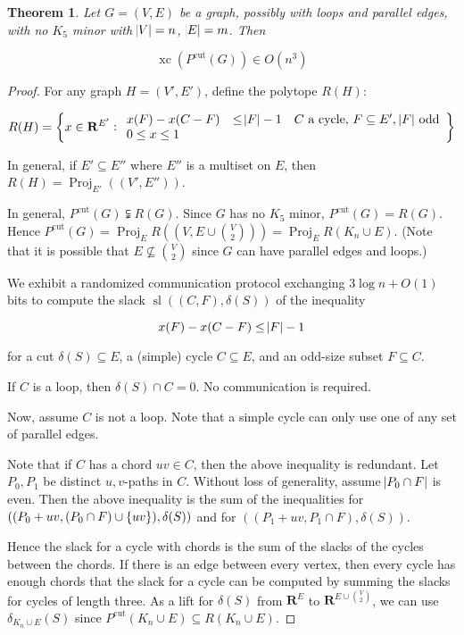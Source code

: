 \documentclass{article}
\newtheorem{theorem}{Theorem}
\DeclareMathOperator{\xc}{xc}
\DeclareMathOperator{\proj}{Proj}
\DeclareMathOperator{\Sl}{sl}
\begin{document}
\begin{theorem}
	Let $G=(V,E)$ be a graph, possibly with loops and parallel edges, with no $K_5$ minor with $\abs{V}=n$, $\abs{E}=m$. Then 

$$\xc(P^{\text{cut}}(G)) \in O(n^3)$$
\end{theorem}
\begin{proof}
For any graph $H=(V', E')$, define the polytope $R(H)$:

$$R(H) = \cbr{x\in \mathbf{R}^{E'}: \begin{array}{lll} x(F) - x(C-F) & \leq \abs{F} - 1 & \text{$C$ a cycle, $F\subseteq E'$, $\abs{F}$ odd} \\ 0 \leq x \leq 1 \end{array}}$$

In general, if $E' \subseteq E''$ where $E''$ is a multiset on $E$, then
$R(H) = \proj_{E'}((V', E''))$.

	In general, $P^{\text{cut}}(G) \subsetneqq R(G)$.
	Since $G$ has no $K_5$ minor, $P^{\text{cut}}(G) = R(G)$.
	Hence $P^{\text{cut}}(G) = \proj_{E} R((V, E\cup {V\choose 2}))=\proj_{E} R(K_n \cup E)$.
	(Note that it is possible that $E\not\subseteq {V\choose 2}$ since
	$G$ can have parallel edges and loops.)

	We exhibit a randomized communication protocol exchanging $3\log n + O(1)$ bits
	to compute the slack $\Sl((C,F), \delta(S))$ of
the inequality

$$x(F) - x(C-F)\leq \abs{F}-1$$

	for a cut $\delta(S)\subseteq E$, a (simple) cycle $C\subseteq E$, and an odd-size
subset $F\subseteq C$.

	If $C$ is a loop, then $\delta(S)\cap C = 0$. No communication is required.

	Now, assume $C$ is not a loop. Note that a simple cycle can only use
	one of any set of parallel edges.

Note that if $C$ has a chord $uv\in C$, then the above inequality is redundant.
Let $P_0, P_1$ be distinct $u,v$-paths in  $C$. Without loss
of generality, assume $\abs{P_0\cap F}$ is even. Then the above inequality
is the sum of the inequalities for $((P_0 + uv, (P_0 \cap F)\cup\cbr{uv}), \delta(S))$
and for $((P_1 + uv, P_1\cap F), \delta(S))$.

Hence the slack for a cycle with chords is the sum of the slacks of the cycles
between the chords. If there is an edge between every vertex, then 
	every cycle has enough chords
that the slack for a cycle can be computed by summing the slacks for
cycles of length three. As a lift for $\delta(S)$ 
from $\mathbf{R}^E$ to $\mathbf{R}^{E\cup{V\choose 2}}$,
we can use $\delta_{K_n\cup E}(S)$ since $P^{\text{cut}}(K_n \cup E) \subseteq R(K_n\cup E)$.


\end{proof}
\end{document}
